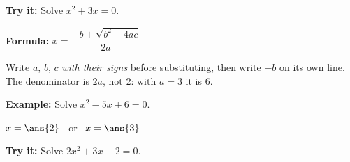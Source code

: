 \documentclass[12pt]{article}
\begin{document}
\begin{tryitbox}
\textbf{Try it:} \quad Solve $x^2 + 3x = 0$.\\[2pt]
\end{tryitbox}


\begin{formulabox}
\textbf{Formula:} \quad $x = \dfrac{-b \pm \sqrt{b^2-4ac}}{2a}$\par\smallskip
Write $a$, $b$, $c$ \emph{with their signs} before substituting, then write $-b$ on its own line. The denominator is $2a$, not $2$: with $a = 3$ it is $6$.
\end{formulabox}

\begin{examplebox}
\textbf{Example:} \quad Solve $x^2 - 5x + 6 = 0$.
\par
$x = \ans{2}$ \ or \ $x = \ans{3}$
\end{examplebox}

\begin{tryitbox}
\textbf{Try it:} \quad Solve $2x^2 + 3x - 2 = 0$.\\[2pt]
\end{tryitbox}
\end{document}
